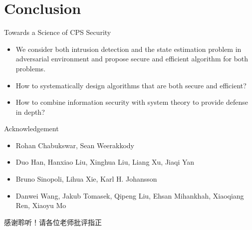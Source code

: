 \documentclass[10pt]{beamer}
\begin{document}
\section{Conclusion}

\begin{frame}{Towards a Science of CPS Security}
  \begin{itemize}
  \item We consider both intrusion detection and the state estimation problem in adversarial environment and propose secure and efficient algorithm for both problems.
  \item How to systematically design algorithms that are both secure and efficient?
  \item How to combine information security with system theory to provide defense in depth?
  \end{itemize}
\end{frame}

\begin{frame}{Acknowledgement}
  \begin{itemize}
  \item Rohan Chabukswar, Sean Weerakkody
  \item Duo Han, Hanxiao Liu, Xinghua Liu, Liang Xu, Jiaqi Yan
  \item Bruno Sinopoli, Lihua Xie, Karl H. Johansson
  \item Danwei Wang, Jakub Tomasek, Qipeng Liu, Ehsan Mihankhah, Xiaoqiang Ren, Xiaoyu Mo 
  \end{itemize}
\end{frame}

\begin{frame}[standout]
  感谢聆听！请各位老师批评指正
\end{frame}
\end{document}
